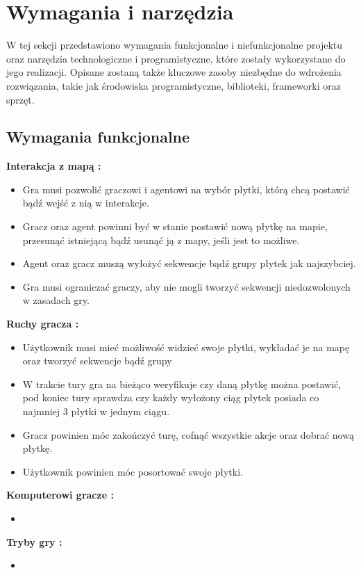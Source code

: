 \documentclass[a4paper,twoside,12pt]{book}
\begin{document}
\chapter{Wymagania i narzędzia}%
\label{ch:wymagania-i-narzedzia}
W tej sekcji przedstawiono wymagania funkcjonalne i niefunkcjonalne projektu oraz narzędzia technologiczne i programistyczne, które zostały wykorzystane do jego realizacji. Opisane zostaną także kluczowe zasoby niezbędne do wdrożenia rozwiązania, takie jak środowiska programistyczne, biblioteki, frameworki oraz sprzęt.
\section{Wymagania funkcjonalne}
\textbf{Interakcja z mapą :}
\begin{itemize}
	\item Gra musi pozwolić graczowi i agentowi na wybór płytki, którą chcą postawić bądź wejść z nią w interakcje.
	\item Gracz oraz agent powinni być w stanie postawić nową płytkę na mapie, przesunąć istniejącą bądź usunąć ją z mapy, jeśli jest to możliwe.
	\item Agent oraz gracz muszą wyłożyć sekwencje bądź grupy płytek jak najszybciej.
	\item Gra musi ograniczać graczy, aby nie mogli tworzyć sekwencji niedozwolonych w zasadach gry.
	
\end{itemize}
\textbf{Ruchy gracza :}
\begin{itemize}
	\item Użytkownik musi mieć możliwość widzieć swoje płytki, wykładać je na mapę oraz tworzyć sekwencje bądź grupy
	\item W trakcie tury gra na bieżąco weryfikuje czy daną płytkę można postawić, pod koniec tury sprawdza czy każdy wyłożony ciąg płytek posiada co najmniej 3 płytki w jednym ciągu.
	\item Gracz powinien móc zakończyć turę, cofnąć wszystkie akcje oraz dobrać nową płytkę.
	\item Użytkownik powinien móc posortować swoje płytki.
\end{itemize}
\textbf{Komputerowi gracze :}
\begin{itemize}
	\item
\end{itemize}
\textbf{Tryby gry :}
\begin{itemize}
	\item
\end{itemize}
\end{document}
